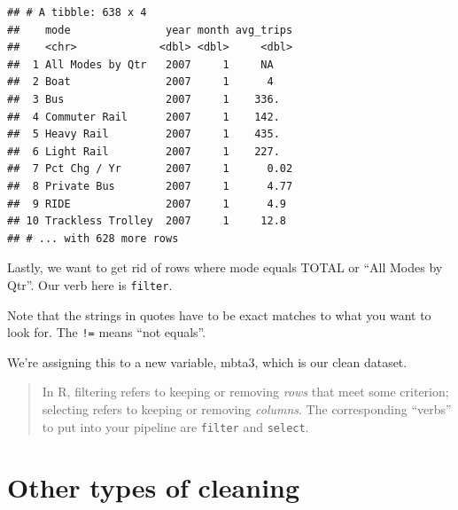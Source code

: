 \documentclass[12pt,letterpaperpaper,openany]{book}
\newenvironment{Shaded}{\begin{snugshade}}{\end{snugshade}}
\newcommand{\DataTypeTok}[1]{\textcolor[rgb]{0.13,0.29,0.53}{#1}}
\newcommand{\DecValTok}[1]{\textcolor[rgb]{0.00,0.00,0.81}{#1}}
\newcommand{\KeywordTok}[1]{\textcolor[rgb]{0.13,0.29,0.53}{\textbf{#1}}}
\newcommand{\NormalTok}[1]{#1}
\newcommand{\OperatorTok}[1]{\textcolor[rgb]{0.81,0.36,0.00}{\textbf{#1}}}
\newcommand{\StringTok}[1]{\textcolor[rgb]{0.31,0.60,0.02}{#1}}
\begin{document}
\begin{verbatim}
## # A tibble: 638 x 4
##    mode               year month avg_trips
##    <chr>             <dbl> <dbl>     <dbl>
##  1 All Modes by Qtr   2007     1     NA   
##  2 Boat               2007     1      4   
##  3 Bus                2007     1    336.  
##  4 Commuter Rail      2007     1    142.  
##  5 Heavy Rail         2007     1    435.  
##  6 Light Rail         2007     1    227.  
##  7 Pct Chg / Yr       2007     1      0.02
##  8 Private Bus        2007     1      4.77
##  9 RIDE               2007     1      4.9 
## 10 Trackless Trolley  2007     1     12.8 
## # ... with 628 more rows
\end{verbatim}

Lastly, we want to get rid of rows where mode equals TOTAL or ``All Modes by Qtr''. Our verb here is \texttt{filter}.

\begin{Shaded}
\end{Shaded}

Note that the strings in quotes have to be exact matches to what you want to look for. The \texttt{!=} means ``not equals''.

We're assigning this to a new variable, mbta3, which is our clean dataset.

\begin{quote}
In R, filtering refers to keeping or removing \emph{rows} that meet some criterion; selecting refers to
keeping or removing \emph{columns}. The corresponding ``verbs'' to put into your pipeline are \texttt{filter} and \texttt{select}.
\end{quote}

\hypertarget{other-types-of-cleaning}{%
\section{Other types of cleaning}\label{other-types-of-cleaning}}
\end{document}

